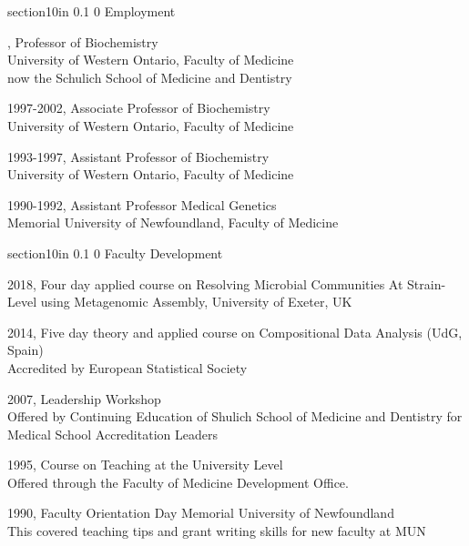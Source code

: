 \documentclass[11pt]{article}
\makeatletter
\renewcommand\section{\@startsection
	{section}{1}{0in}%
	{0.1\baselineskip}%
	{0\baselineskip}%
	{\sffamily\bfseries\large}
}
\makeatother
\begin{document}
\section{Employment}\itemsep=2pt
\begin{description}\itemsep=2pt
\item[2002-present], Professor of Biochemistry\\ University of Western Ontario, Faculty of Medicine\\ now the Schulich School of Medicine and Dentistry
\item 1997-2002, Associate Professor of Biochemistry\\ University of Western Ontario, Faculty of Medicine
\item 1993-1997,	Assistant Professor of Biochemistry\\ University of Western Ontario, Faculty of Medicine
\item 1990-1992,	Assistant Professor Medical Genetics\\ Memorial University of Newfoundland, Faculty of Medicine
\end{description}
\section{Faculty Development}
\begin{description}
\item 2018, Four day applied course on Resolving Microbial Communities At Strain-Level using Metagenomic Assembly, University of Exeter, UK
\item 2014, Five day theory and applied course on Compositional Data Analysis (UdG, Spain)\\ Accredited by European Statistical Society

\item 2007, Leadership Workshop\\ Offered by Continuing Education of Shulich School of Medicine and Dentistry for Medical School Accreditation Leaders
\item 1995,  Course on Teaching at the University 	Level\\ Offered through the Faculty of Medicine Development Office.
\item 1990, Faculty Orientation Day Memorial University of Newfoundland\\
		This covered teaching tips and grant writing skills for 	new faculty at MUN

\end{description}
\end{document}
